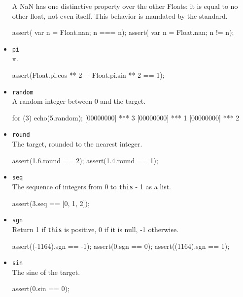 \begin{itemize}
A {NaN} has one distinctive property over the other Floats: it is
equal to no other float, not even itself.  This behavior is mandated
by the  standard.
\begin{urbiscript}[firstnumber=last]
assert({ var n = Float.nan; n === n});
assert({ var n = Float.nan; n  != n});
\end{urbiscript}

\item \lstinline|pi|\\
  $\pi$.
\begin{urbiscript}[firstnumber=last]
assert(Float.pi.cos ** 2 + Float.pi.sin ** 2 == 1);
\end{urbiscript}

\item \lstinline|random|\\
  A random integer between 0 and the target.
\begin{urbiscript}[firstnumber=last]
for (3)
  echo(5.random);
[00000000] *** 3
[00000000] *** 1
[00000000] *** 2
\end{urbiscript}

\item \lstinline|round|\\
  The target, rounded to the nearest integer.
\begin{urbiscript}[firstnumber=last]
assert(1.6.round == 2);
assert(1.4.round == 1);
\end{urbiscript}

\item \lstinline|seq|\\
  The sequence of integers from 0 to \lstinline|this| - 1 as a list.
\begin{urbiscript}[firstnumber=last]
assert(3.seq == [0, 1, 2]);
\end{urbiscript}

\item \lstinline|sgn|\\
  Return 1 if \lstinline|this| is positive, 0 if it is null, -1
  otherwise.
\begin{urbiscript}[firstnumber=last]
assert((-1164).sgn == -1);
assert(0.sgn       == 0);
assert((1164).sgn  == 1);
\end{urbiscript}

\item \lstinline|sin|\\
  The sine of the target.
\begin{urbiscript}[firstnumber=last]
assert(0.sin == 0);
\end{urbiscript}


\end{itemize}
